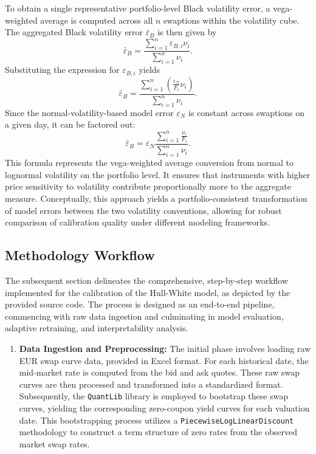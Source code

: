 {To obtain a single representative portfolio-level Black volatility error, a vega-weighted average is computed across all \( n \) swaptions within the volatility cube. The aggregated Black volatility error \( \bar{\varepsilon}_B \) is then given by
\begin{equation}
	\bar{\varepsilon}_B = \frac{\sum_{i=1}^{n} \varepsilon_{B,i} \nu_i}{\sum_{i=1}^{n} \nu_i}.
\end{equation}
Substituting the expression for \( \varepsilon_{B,i} \) yields
\begin{equation}
	\bar{\varepsilon}_B = \frac{\sum_{i=1}^{n} \left( \frac{\varepsilon_N}{F_i} \nu_i \right)}{\sum_{i=1}^{n} \nu_i}.
\end{equation}
Since the normal-volatility-based model error \( \varepsilon_N \) is constant across swaptions on a given day, it can be factored out:
\begin{equation}
	\bar{\varepsilon}_B = \varepsilon_N \frac{\sum_{i=1}^{n} \frac{\nu_i}{F_i}}{\sum_{i=1}^{n} \nu_i}.
\end{equation}
This formula represents the vega-weighted average conversion from normal to lognormal volatility on the portfolio level. It ensures that instruments with higher price sensitivity to volatility contribute proportionally more to the aggregate measure. Conceptually, this approach yields a portfolio-consistent transformation of model errors between the two volatility conventions, allowing for robust comparison of calibration quality under different modeling frameworks.

\subsection{Methodology Workflow}
The subsequent section delineates the comprehensive, step-by-step workflow implemented for the calibration of the Hull-White model, as depicted by the provided source code. The process is designed as an end-to-end pipeline, commencing with raw data ingestion and culminating in model evaluation, adaptive retraining, and interpretability analysis.

\begin{enumerate}
	\item \textbf{Data Ingestion and Preprocessing:}
	      The initial phase involves loading raw EUR swap curve data, provided in Excel format. For each historical date, the mid-market rate is computed from the bid and ask quotes. These raw swap curves are then processed and transformed into a standardized format. Subsequently, the \texttt{QuantLib} library is employed to bootstrap these swap curves, yielding the corresponding zero-coupon yield curves for each valuation date. This bootstrapping process utilizes a \texttt{PiecewiseLogLinearDiscount} methodology to construct a term structure of zero rates from the observed market swap rates.


\end{enumerate}}
